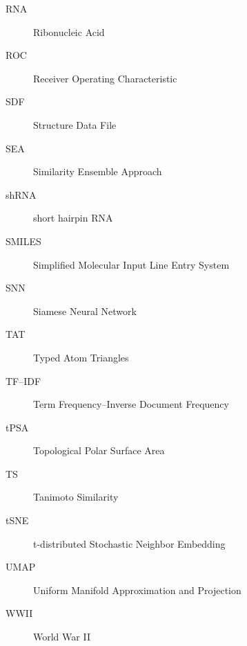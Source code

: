 \begin{description}
    \item[RNA] Ribonucleic Acid
    \item[ROC] Receiver Operating Characteristic
    \item[SDF] Structure Data File
    \item[SEA] Similarity Ensemble Approach
    \item[shRNA] short hairpin RNA
    \item[SMILES] Simplified Molecular Input Line Entry System
    \item[SNN] Siamese Neural Network
    \item[TAT] Typed Atom Triangles
    \item[TF–IDF] Term Frequency–Inverse Document Frequency
    \item[tPSA] Topological Polar Surface Area
    \item[TS] Tanimoto Similarity
    \item[tSNE] t-distributed Stochastic Neighbor Embedding
    \item[UMAP] Uniform Manifold Approximation and Projection
    \item[WWII] World War II
\end{description}

